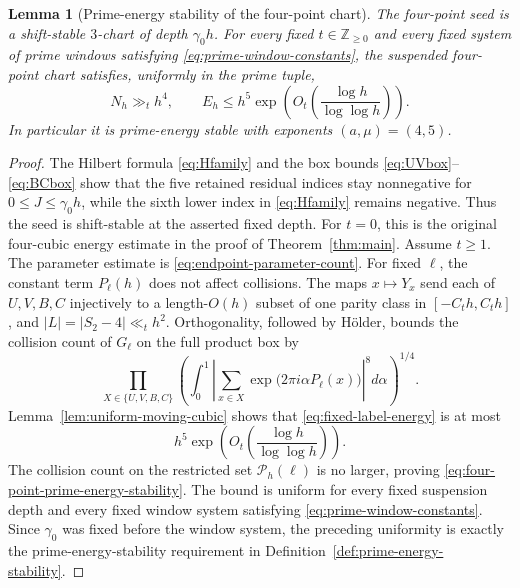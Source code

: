 \documentclass[11pt,reqno]{amsart}
\newtheorem{lemma}[theorem]{Lemma}
\theoremstyle{definition}
\theoremstyle{remark}
\begin{document}
\begin{lemma}[Prime-energy stability of the four-point chart]
\label{lem:four-point-prime-energy-stability}
The four-point seed is a shift-stable $3$-chart of depth $\gamma_0h$.
For every fixed $t\in\mathbb Z_{\geq0}$ and every fixed system of prime
windows satisfying \eqref{eq:prime-window-constants},
the suspended four-point chart satisfies, uniformly in the prime tuple,
\begin{equation}\label{eq:four-point-prime-energy-stability}
 N_h\gg_t h^4,
 \qquad
 E_h\leq h^5\exp\!\left(O_t\!\left(
  \frac{\log h}{\log\log h}\right)\right).
\end{equation}
In particular it is prime-energy stable with exponents $(a,\mu)=(4,5)$.
\end{lemma}

\begin{proof}
The Hilbert formula \eqref{eq:Hfamily} and the box bounds
\eqref{eq:UVbox}--\eqref{eq:BCbox} show that the five retained residual
indices stay nonnegative for $0\leq J\leq\gamma_0h$, while the sixth lower
index in \eqref{eq:Hfamily} remains negative.  Thus the seed is
shift-stable at the asserted fixed depth.
For $t=0$, this is the original four-cubic energy estimate in the proof of
Theorem~\ref{thm:main}.  Assume $t\geq1$.  The parameter estimate is
\eqref{eq:endpoint-parameter-count}.  For fixed
$\boldsymbol\ell$, the constant term
$P_{\boldsymbol\ell}(h)$ does not affect collisions.  The maps
$x\mapsto Y_x$ send each of $U,V,B,C$ injectively to a length-$O(h)$
subset of one parity class in $[-C_th,C_th]$, and
$|L|=|S_2-4|\ll_th^2$.  Orthogonality, followed by H\"older, bounds the
collision count of $G_{\boldsymbol\ell}$ on the full product box by
\begin{equation}\label{eq:fixed-label-energy}
 \prod_{X\in\{U,V,B,C\}}
 \left(
  \int_0^1\left|
   \sum_{x\in X}
   \exp\bigl(2\pi i\alpha P_{\boldsymbol\ell}(x)\bigr)
  \right|^8d\alpha
 \right)^{1/4}.
\end{equation}
Lemma~\ref{lem:uniform-moving-cubic} shows that
\eqref{eq:fixed-label-energy} is at most
\[
 h^5\exp\!\left(O_t\!\left(
  \frac{\log h}{\log\log h}\right)\right).
\]
The collision count on the restricted set
$\mathcal P_h(\boldsymbol\ell)$ is no larger, proving
\eqref{eq:four-point-prime-energy-stability}.  The bound is uniform for every
fixed suspension depth and every fixed window system satisfying
\eqref{eq:prime-window-constants}.  Since $\gamma_0$ was fixed before the
window system, the preceding uniformity is exactly the
prime-energy-stability requirement in
Definition~\ref{def:prime-energy-stability}.
\end{proof}
\end{document}
